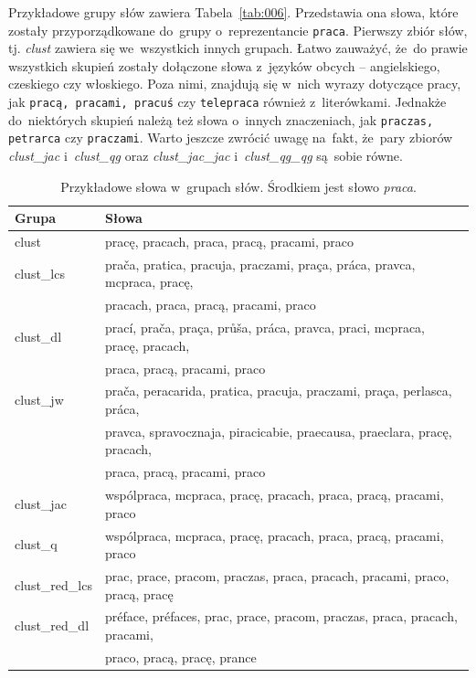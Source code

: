 \documentclass{praca1}
\begin{document}
Przykładowe grupy słów zawiera Tabela~\ref{tab:006}. Przedstawia ona słowa, które zostały przyporządkowane do~grupy o~reprezentancie \verb|praca|. Pierwszy zbiór słów, tj. \emph{clust} zawiera się we~wszystkich innych grupach. Łatwo zauważyć, że~do prawie wszystkich skupień zostały dołączone słowa z~języków obcych -- angielskiego, czeskiego czy włoskiego. Poza nimi, znajdują się w~nich wyrazy dotyczące pracy, jak \verb|pracą, pracami, pracuś| czy \verb|telepraca| również z~literówkami. Jednakże do~niektórych skupień należą też słowa o~innych znaczeniach, jak \verb|praczas, petrarca| czy \verb|praczami|. Warto jeszcze zwrócić uwagę na~fakt, że~pary zbiorów \emph{clust\_jac} i~\emph{clust\_qg} oraz \emph{clust\_jac\_jac} i~\emph{clust\_qg\_qg} są~sobie równe.

\begin{table}[!h]
\centering
\caption{Przykładowe słowa w~grupach słów. Środkiem jest słowo \emph{praca}.}\smallskip
\begin{tabular}{|l|l|}
\hline
 Grupa & Słowa \\ 
  \hline \hline
clust & pracę, pracach, praca, pracą, pracami, praco \\ 
   \hline
clust\_lcs & prača, pratica, pracuja, praczami, praça, práca, pravca, mcpraca, pracę, \\ &  pracach, praca, pracą, pracami, praco \\ 
   \hline
clust\_dl & prací, prača, praça, průša, práca, pravca, praci, mcpraca, pracę, pracach, \\ &  praca, pracą, pracami, praco \\ 
   \hline
clust\_jw & prača, peracarida, pratica, pracuja, praczami, praça, perlasca, práca,  \\ & pravca, spravocznaja, piracicabie, praecausa, praeclara, pracę, pracach, \\ &  praca, pracą, pracami, praco \\ 
   \hline
clust\_jac & wspólpraca, mcpraca, pracę, pracach, praca, pracą, pracami, praco \\ 
   \hline
clust\_q & wspólpraca, mcpraca, pracę, pracach, praca, pracą, pracami, praco \\ 
   \hline
clust\_red\_lcs & prac, prace, pracom, praczas, praca, pracach, pracami, praco, pracą, pracę \\ 
   \hline
clust\_red\_dl & préface, préfaces, prac, prace, pracom, praczas, praca, pracach, pracami, \\ &  praco, pracą, pracę, prance \\ 

\end{tabular}
\end{table}
\end{document}
